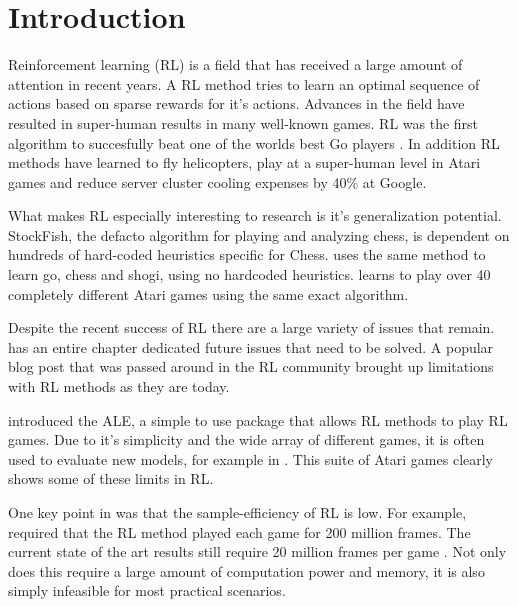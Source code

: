 
\chapter{Introduction}\label{ch:intro}

Reinforcement learning (RL) is a field that has received a large amount of attention in recent years. A RL method tries to learn an optimal sequence of actions based on sparse rewards for it's actions. Advances in the field have resulted in super-human results in many well-known games. RL was the first algorithm to succesfully beat one of the worlds best Go players \cite{silver_2017}. In addition RL methods have learned to fly helicopters\cite{abbeel_2007}, play at a super-human level in Atari games \cite{mnih_2015} and reduce server cluster cooling expenses by 40\% at Google\cite{deepmind}.

What makes RL especially interesting to research is it's generalization potential.  StockFish, the defacto algorithm for playing and analyzing chess, is dependent on hundreds of hard-coded heuristics specific for Chess. \cite{silver_2017b} uses the same method to learn go, chess and shogi, using no hardcoded heuristics. \cite{mnih_2015} learns to play over 40 completely different Atari games using the same exact algorithm.

Despite the recent success of RL there are a large variety of issues that remain. \cite{sutton_barto_2018} has an entire chapter dedicated future issues that need to be solved. A popular blog post that was passed around in the RL community \citep{blog} brought up limitations with RL methods as they are today. 

\cite{bellemare_2012} introduced the ALE, a simple to use package that allows RL methods to play RL games.  Due to it's simplicity and the wide array of different games, it is often used to evaluate new models, for example in \cite{mnih_2015}. This suite of Atari games clearly shows some of these limits in RL. 

One key point in \cite{blog} was that the sample-efficiency of RL is low. For example, \cite{mnih_2015} required that the RL method played each game for 200 million frames. The current state of the art results still require 20 million frames per game \citep{hessel_2017}. Not only does this require a large amount of computation power and memory, it is also simply infeasible for most practical scenarios.

